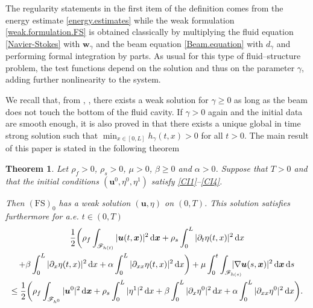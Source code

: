 \documentclass[JEP,XML,SOM,Unicode,NoFloatCountersInSection]{cedram}
\let\mathcal\mathscr
\newcommand{\FS}{\mathrm{FS}}
\newtheorem{theorem}{Theorem}
\theoremstyle{remark}
\theoremstyle{definition}
\newcommand{\ug}{\boldsymbol{u}}
\newcommand{\xg}{\boldsymbol{x}}
\newcommand{\dd}{\,\mathrm{d}}
\newcommand{\wg}{\boldsymbol{w}}
\begin{document}
The regularity statements in the first item of the definition comes from the energy estimate \eqref{energy.estimates} while
the weak formulation \eqref{weak.formulation.FS} is obtained classically by multiplying the fluid equation \eqref{Navier-Stokes}
with $\wg_{\gamma}$ and the beam equation \eqref{Beam.equation} with $d_{\gamma}$ and performing formal integration by parts. As usual for this type of fluid--structure problem, the test functions depend on the solution and thus on the parameter $\gamma$, adding further nonlinearity to the system.

We recall that, from \cite{Chambolle-etal}, \cite{Grandmont08}, there exists a weak solution for $\gamma \geq 0$ as long as the beam does not touch the bottom of the fluid cavity. If $\gamma >0$ again and the initial data are smooth enough, it is also proved in \cite{Grandmont-Hillairet} that there exists a unique global in time strong solution such that $\min_{x\in [0, L]}h_\gamma(t,x)>0$ for all $t>0$. 
The main result of this paper is stated in the following theorem

\begin{theorem}\label{main.theorem}
Let $\rho_{f}>0$, $\rho_{s}>0$, $\mu>0$, $\beta\geq 0$ and $\alpha>0$. Suppose that $T>0$ and that the initial conditions $(\ug^{0},\eta^{0},\eta^{1})$ satisfy \eqref{CI1}--\eqref{CI4}.

Then $(\FS)_0$ has a weak solution $(\ug,\eta)$ on $(0,T)$. This solution satisfies furthermore for a.e. $t \in (0,T)$
\begin{multline}\label{energy.estimates.thm}
\frac{1}{2}\biggl(\rho_{f}\int_{\mathcal{F}_{h(t)}}\vert\ug(t, \xg) \vert^{2} \dd\xg + \rho_{s}\int_{0}^{L}\vert\partial_{t}\eta(t, x) \vert^{2} \dd x\\
\shoveright{+\beta\int_{0}^{L}\vert\partial_{x}\eta(t, x) \vert^{2} \dd x+\alpha\int_{0}^{L}\vert\partial_{xx}\eta(t, x) \vert^{2} \dd x\biggr)
+ \mu\int_0^t\int_{\mathcal{F}_{h(s)}}\hspace*{-5mm}\vert \nabla\ug(s, \xg) \vert^{2} \dd\xg\dd s}\\
\leq \frac{1}{2}\biggl(\rho_{f}\int_{\mathcal{F}_{h^0}}\vert\ug^0\vert^{2} \dd \xg+ \rho_{s}\int_{0}^{L}\vert\eta^1\vert^{2}\dd x
+\beta\int_{0}^{L}\vert\partial_{x}\eta^0\vert^{2}\dd x+\alpha\int_{0}^{L}\vert\partial_{xx}\eta^0\vert^{2}\dd x\biggr).
\end{multline}
\end{theorem}
\end{document}
